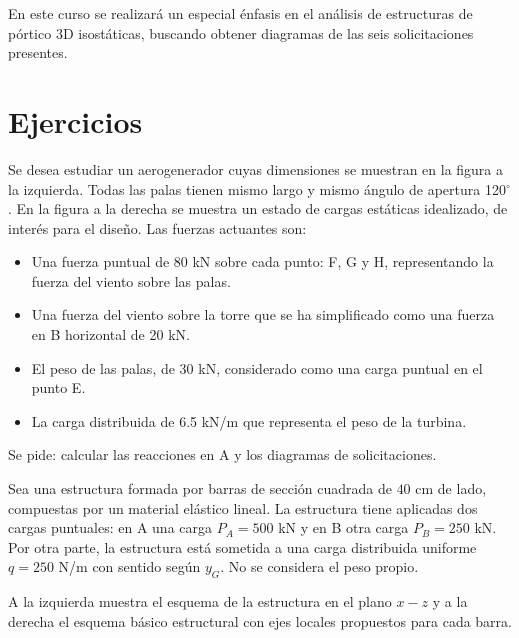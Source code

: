 En este curso se realizará un especial énfasis en el análisis de estructuras de pórtico 3D isostáticas, buscando obtener diagramas de  las seis solicitaciones presentes.


\section{Ejercicios}
\setcounter{ejercicio}{0}
\ejercicio

Se desea estudiar un aerogenerador cuyas dimensiones se muestran en la figura a la izquierda. Todas las palas tienen mismo largo y mismo ángulo de apertura 120$^\circ$. %
%
%
En la figura a la derecha se muestra un estado de cargas estáticas idealizado, de interés para el diseño. %
%
Las fuerzas actuantes son:
\begin{itemize}
	\item Una fuerza puntual de 80 kN sobre cada punto: F, G y H, representando la fuerza del viento sobre las palas. 
	\item Una fuerza del viento sobre la torre que se ha simplificado como una fuerza en B horizontal de 20 kN. 
	\item El peso de las palas, de 30 kN, considerado como una carga puntual en el punto E.
	\item La carga distribuida de 6.5 kN/m que representa el peso de la turbina.
\end{itemize}

Se pide: calcular las reacciones en A y los diagramas de solicitaciones.

\begin{center}
	\def\svgwidth{0.45\textwidth}
	
\end{center}





\ejercicio \label{ejUt5Grua}

Sea una estructura formada por barras de sección cuadrada de $40$ cm de lado, compuestas por un material elástico lineal. La estructura tiene aplicadas dos cargas puntuales: en A una carga $P_A = 500$ kN y en B otra carga $P_B = 250$ kN. Por otra parte, la estructura está sometida a una carga distribuida uniforme $q= 250 $ N/m con sentido según $y_G$. No se considera el peso propio.

A la izquierda muestra el esquema de la estructura en el plano $x-z$ y a la derecha el esquema básico estructural con ejes locales propuestos para cada barra.

\begin{center}
	\def\svgwidth{\textwidth}
	
\end{center}

